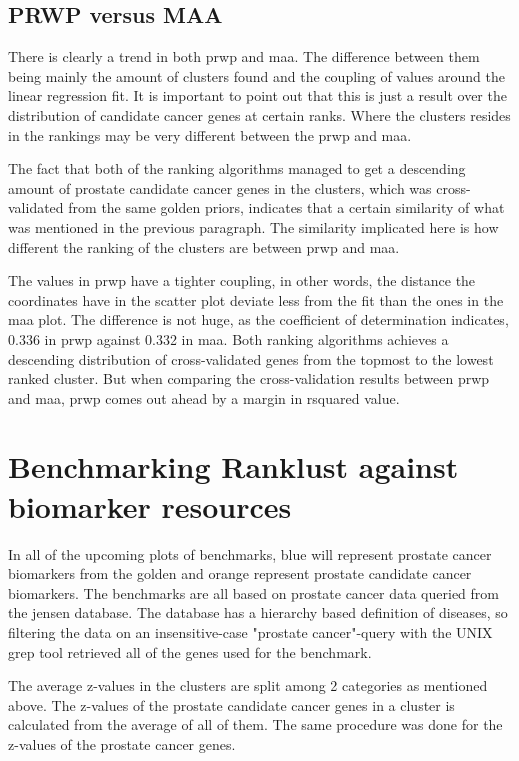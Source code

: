 \subsection{PRWP versus MAA}
There is clearly a trend in both \gls{prwp} and \gls{maa}. The difference
between them being mainly the amount of clusters found and the coupling of
values around the linear regression fit. It is important to point out that this
is just a result over the distribution of candidate cancer genes at certain
ranks. Where the clusters resides in the rankings may be very different between
the \gls{prwp} and \gls{maa}.

The fact that both of the ranking algorithms managed to get a descending amount
of prostate candidate cancer genes in the clusters, which was cross-validated
from the same \gls{golden} priors, indicates that a certain similarity of what
was mentioned in the previous paragraph. The similarity implicated here is how
different the ranking of the clusters are between \gls{prwp} and \gls{maa}.

The values in \gls{prwp} have a tighter coupling, in other words, the distance
the coordinates have in the scatter plot deviate less from the fit than the ones
in the \gls{maa} plot. The difference is not huge, as the coefficient of
determination indicates, 0.336 in \gls{prwp} against 0.332 in \gls{maa}. Both
ranking algorithms achieves a descending distribution of cross-validated genes
from the topmost to the lowest ranked cluster. But when comparing the
cross-validation results between \gls{prwp} and \gls{maa}, \gls{prwp} comes out
ahead by a margin in \gls{rsquared} value.

\section{Benchmarking Ranklust against biomarker resources}
In all of the upcoming plots of benchmarks, blue will represent prostate cancer
biomarkers from the \gls{golden} and orange represent prostate candidate cancer
biomarkers. The benchmarks are all based on prostate cancer data queried from
the \gls{jensen} database\cite{jensen}. The database has a hierarchy based
definition of diseases, so filtering the data on an insensitive-case "prostate
cancer"-query with the UNIX grep tool\cite{grep} retrieved all of the genes used
for the benchmark.

The average z-values in the clusters are split among 2 categories as mentioned
above. The z-values of the prostate candidate cancer genes in a cluster is
calculated from the average of all of them. The same procedure was done for the
z-values of the prostate cancer genes. 

